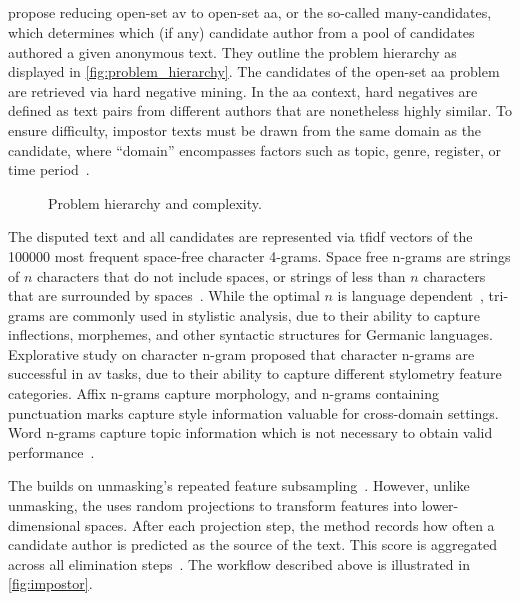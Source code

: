 \subsection{\impAppr{}}
\label{sec:impostor_method_theory}

\citet{koppel_determining_2014} propose reducing open-set \ac{av} to open-set \ac{aa}, or the so-called many-candidates, which determines which (if any) candidate author from a pool of candidates authored a given anonymous text. 
They outline the problem hierarchy as displayed in \autoref{fig:problem_hierarchy}.
The candidates of the open-set \ac{aa} problem are retrieved via hard negative mining. 
In the \ac{aa} context, hard negatives are defined as text pairs from different authors that are nonetheless highly similar. 
To ensure difficulty, impostor texts must be drawn from the same domain as the candidate, where “domain” encompasses factors such as topic, genre, register, or time period~\citep{bischoff_importance_2020}. 

\begin{figure}[htbp]
    \centering
    
    \caption{Problem hierarchy and complexity.}
    \label{fig:problem_hierarchy}
\end{figure}

The disputed text and all candidates are represented via \ac{tfidf} vectors of the \num{100000} most frequent space-free character 4-grams.
Space free n-grams are strings of $n$ characters that do not include spaces, or strings of less than $n$ characters that are surrounded by spaces~\citep{koppel_authorship_2011,neal_surveying_2018}.
While the optimal $n$ is language dependent~\citep{neal_surveying_2018}, tri-grams are commonly used in stylistic analysis, due to their ability to capture inflections, %
morphemes, %
and other syntactic structures for Germanic languages.
Explorative study on character n-gram proposed that character n-grams are successful in \ac{av} tasks, due to their ability to capture different stylometry feature categories.
Affix n-grams capture morphology, and n-grams containing punctuation marks capture style information valuable for cross-domain settings.
Word n-grams capture topic information which is not necessary to obtain valid performance~\citep{Sapkota_ngrams_2015}.

The \impAppr{} builds on unmasking's repeated feature subsampling~\citep{koppel_authorship_2004}. 
However, unlike unmasking, the \impAppr{} uses random projections to transform features into lower-dimensional spaces.
After each projection step, the method records how often a candidate author is predicted as the source of the text. 
This score is aggregated across all elimination steps~\citep{tyo_state_2022}.
The workflow described above is illustrated in \autoref{fig:impostor}.

